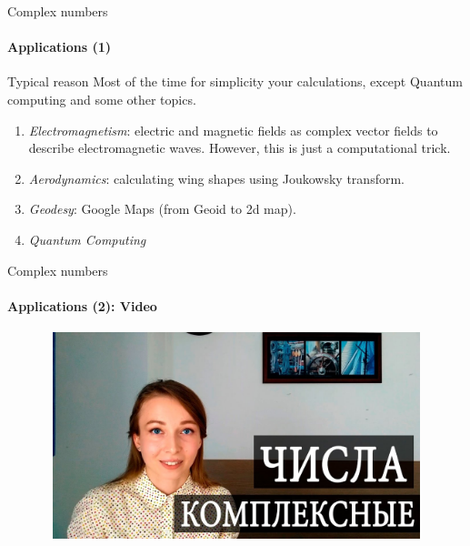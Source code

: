 \documentclass[aspectratio=169]{beamer}
\begin{document}
\begin{frame}[t]{Complex numbers}
\framesubtitle{Applications (1)}
\vspace{-0.4cm}
\large
\begin{block}{Typical reason}
    Most of the time for simplicity your calculations, except Quantum computing and some other topics.
\end{block}
    \begin{enumerate}
        \item \textit{Electromagnetism}: electric and magnetic fields as complex vector fields to describe electromagnetic waves. However, this is just a computational trick.
        \item \textit{Aerodynamics}: calculating wing shapes using Joukowsky transform.
        \item \textit{Geodesy}: Google Maps (from Geoid to 2d map).
        \item \textit{Quantum Computing}
    \end{enumerate}
\end{frame}

\begin{frame}[t]{Complex numbers}
    \framesubtitle{Applications (2): Video}
    \vspace{-0.6cm}
    \begin{figure}[H]
        \href{https://www.youtube.com/watch?v=JA_VZ8Frrvw}{
            \centering\includegraphics[height=6cm,width=1\textwidth,keepaspectratio]{com_video.jpg}}
        \label{fig:com_video.jpg}
    \end{figure}
\end{frame}
\end{document}
